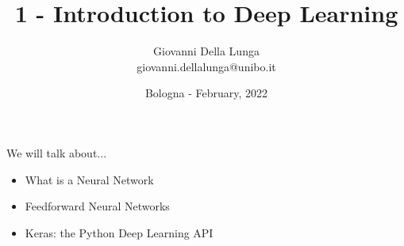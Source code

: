 \documentclass[11pt]{beamer}
\author{Giovanni Della Lunga\\{\footnotesize giovanni.dellalunga@unibo.it}}
\title{1 - Introduction to Deep Learning}
\subtitle{} %
\institute{Introduction to Machine Learning for Finance}
\date{Bologna - February, 2022}
\begin{document}
\begin{frame}
\titlepage
\end{frame}

\AtBeginSubsection{\frame{\subsectionpage}}


\begin{frame}{We will talk about...}
\begin{itemize}
\item What is a Neural Network
\item Feedforward Neural Networks
\item Keras: the Python Deep Learning API  
\end{itemize}
\end{frame}
\end{document}
